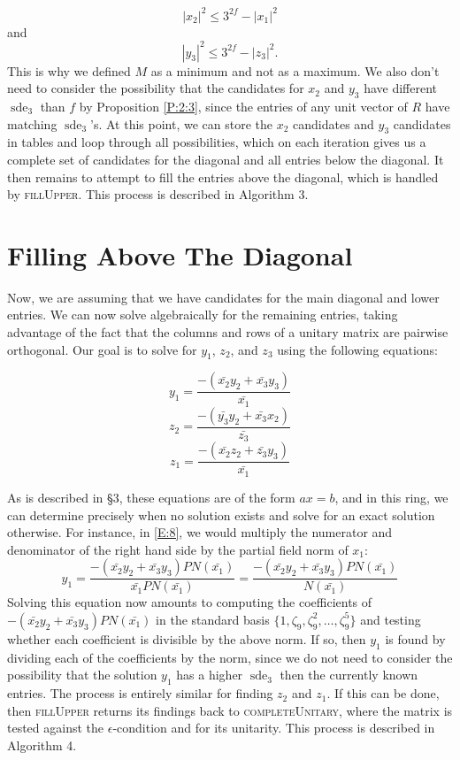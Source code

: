 \documentclass[12pt]{amsart}
\theoremstyle{definition}
\DeclareMathOperator{\sde}{sde}
\begin{document}
	$$
	|x_2|^2 \leq 3^{2f} - |x_1|^2
	$$ and $$
	|y_3|^2 \leq 3^{2f} - |z_3|^2.
	$$
	This is why we defined $M$ as a minimum and not as a maximum. We also don't need to consider the possibility that the candidates for $x_2$ and $y_3$ have different $\sde_3$ than $f$ by Proposition \ref{P:2:3}, since the entries of any unit vector of $R$ have matching $\sde_3$'s. At this point, we can store the $x_2$ candidates and $y_3$ candidates in tables and loop through all possibilities, which on each iteration gives us a complete set of candidates for the diagonal and all entries below the diagonal. It then remains to attempt to fill the entries above the diagonal, which is handled by \textsc{fillUpper}. This process is described in Algorithm 3.  
	

	
	\section{Filling Above The Diagonal}
	
	Now, we are assuming that we have candidates for the main diagonal and lower entries. We can now solve algebraically for the remaining entries, taking advantage of the fact that the columns and rows of a unitary matrix are pairwise orthogonal. Our goal is to solve for $y_1$, $z_2$, and $z_3$ using the following equations:
	
	\begin{equation}\label{E:6}
		y_1 = \dfrac{-(\bar{x_2}y_2 + \bar{x_3}y_3)}{\bar{x_1}}
	\end{equation}
	\begin{equation}\label{E:7}
		z_2 = \dfrac{-(\bar{y_3}y_2 + \bar{x_3}x_2)}{\bar{z_3}}
	\end{equation}
	\begin{equation}\label{E:8}
		z_1 = \dfrac{-(\bar{x_2}z_2 + \bar{z_3}y_3)}{\bar{x_1}}
	\end{equation}
	
	As is described in \S3, these equations are of the form $ax = b$, and in this ring, we can determine precisely when no solution exists and solve for an exact solution otherwise. For instance, in \eqref{E:8}, we would multiply the numerator and denominator of the right hand side by the partial field norm of $x_1$:
	$$
	y_1 = \dfrac{-(\bar{x_2}y_2 + \bar{x_3}y_3)PN(\bar{x_1})}{\bar{x_1}PN(\bar{x_1})} = \dfrac{-(\bar{x_2}y_2 + \bar{x_3}y_3)PN(\bar{x_1})}{N(\bar{x_1})}
	$$
	Solving this equation now amounts to computing the coefficients of $-(\bar{x_2}y_2 + \bar{x_3}y_3)PN(\bar{x_1})$ in the standard basis $\{1,\zeta_9,\zeta_9^2,\ldots,\zeta_9^5\}$ and testing whether each coefficient is divisible by the above norm. If so, then $y_1$ is found by dividing each of the coefficients by the norm, since we do not need to consider the possibility that the solution $y_1$ has a higher $\sde_3$ then the currently known entries. The process is entirely similar for finding $z_2$ and $z_1$. If this can be done, then \textsc{fillUpper} returns its findings back to \textsc{completeUnitary}, where the matrix is tested against the $\epsilon$-condition and for its unitarity. This process is described in Algorithm 4.  
	
\end{document}
